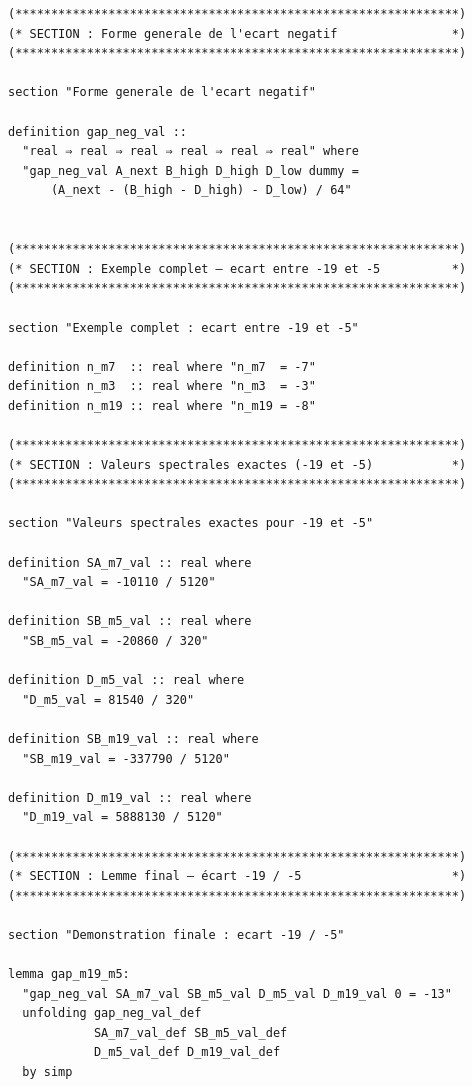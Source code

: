 \documentclass[a4paper,11pt]{article}
\begin{document}
\begin{holcode}[title={\textcolor{white}{File: methode\_spectral.thy -- Part 6/6 (END)}}]
\begin{lstlisting}
(**************************************************************)
(* SECTION : Forme generale de l'ecart negatif                *)
(**************************************************************)

section "Forme generale de l'ecart negatif"

definition gap_neg_val ::
  "real ⇒ real ⇒ real ⇒ real ⇒ real ⇒ real" where
  "gap_neg_val A_next B_high D_high D_low dummy =
      (A_next - (B_high - D_high) - D_low) / 64"


(**************************************************************)
(* SECTION : Exemple complet – ecart entre -19 et -5          *)
(**************************************************************)

section "Exemple complet : ecart entre -19 et -5"

definition n_m7  :: real where "n_m7  = -7"
definition n_m3  :: real where "n_m3  = -3"
definition n_m19 :: real where "n_m19 = -8"

(**************************************************************)
(* SECTION : Valeurs spectrales exactes (-19 et -5)           *)
(**************************************************************)

section "Valeurs spectrales exactes pour -19 et -5"

definition SA_m7_val :: real where
  "SA_m7_val = -10110 / 5120"

definition SB_m5_val :: real where
  "SB_m5_val = -20860 / 320"

definition D_m5_val :: real where
  "D_m5_val = 81540 / 320"

definition SB_m19_val :: real where
  "SB_m19_val = -337790 / 5120"

definition D_m19_val :: real where
  "D_m19_val = 5888130 / 5120"

(**************************************************************)
(* SECTION : Lemme final – écart -19 / -5                     *)
(**************************************************************)

section "Demonstration finale : ecart -19 / -5"

lemma gap_m19_m5:
  "gap_neg_val SA_m7_val SB_m5_val D_m5_val D_m19_val 0 = -13"
  unfolding gap_neg_val_def
            SA_m7_val_def SB_m5_val_def
            D_m5_val_def D_m19_val_def
  by simp



\end{lstlisting}
\end{holcode}
\end{document}
